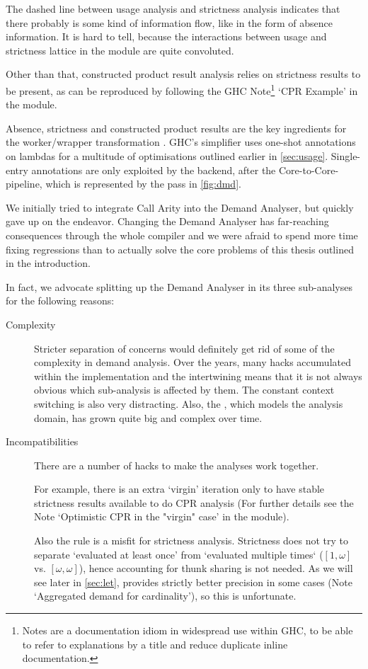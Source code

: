 The dashed line between usage analysis and strictness analysis indicates that there probably is some kind of information flow, like in the form of absence information. 
It is hard to tell, because the interactions between usage and strictness lattice in the  module are quite convoluted.

Other than that, constructed product result analysis relies on strictness results to be present, as can be reproduced by following the GHC Note\footnote{Notes are a documentation idiom in widespread use within GHC, to be able to refer to explanations by a title and reduce duplicate inline documentation.} `CPR Example' in the  module.

Absence, strictness and constructed product results are the key ingredients for the worker/wrapper transformation \parencite{ww}.
GHC's simplifier uses one-shot annotations on lambdas for a multitude of optimisations outlined earlier in \cref{sec:usage}.
Single-entry annotations are only exploited by the backend, after the Core-to-Core-pipeline, which is represented by the  pass in \cref{fig:dmd}.\medskip

We initially tried to integrate Call Arity into the Demand Analyser, but quickly gave up on the endeavor.
Changing the Demand Analyser has far-reaching consequences through the whole compiler and we were afraid to spend more time fixing regressions than to actually solve the core problems of this thesis outlined in the introduction.

In fact, we advocate splitting up the Demand Analyser in its three sub-analyses for the following reasons:
\begin{description}
  \item[Complexity] 
    Stricter separation of concerns would definitely get rid of some of the complexity in demand analysis.
    Over the years, many hacks accumulated within the implementation and the intertwining means that it is not always obvious which sub-analysis is affected by them.
    The constant context switching is also very distracting.
    Also, the , which models the analysis domain, has grown quite big and complex over time.
  \item[Incompatibilities]
    There are a number of hacks to make the analyses work together.

    For example, there is an extra `virgin' iteration only to have stable strictness results available to do CPR analysis (For further details see the Note `Optimistic CPR in the "virgin" case' in the  module).

    Also the  rule is a misfit for strictness analysis.
    Strictness does not try to separate `evaluated at least once' from `evaluated multiple times` (\eg $[1,\omega]$ vs. $[\omega,\omega]$), hence accounting for thunk sharing is not needed.
    As we will see later in \cref{sec:let},  provides strictly better precision in some cases (Note `Aggregated demand for cardinality'), so this is unfortunate.
\end{description}

